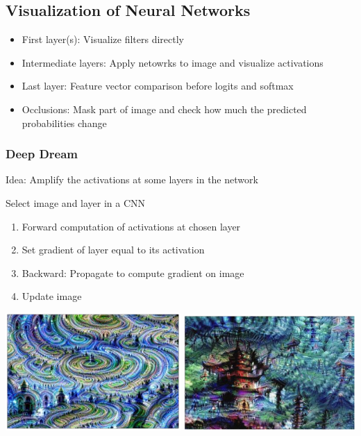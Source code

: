 \subsection{Visualization of Neural Networks}
\begin{itemize}
    \item First layer(s): Visualize filters directly
    \item Intermediate layers: Apply netowrks to image and visualize activations
    \item Last layer: Feature vector comparison before logits and softmax
    \item Occlusions: Mask part of image and check how much the predicted probabilities change
\end{itemize}

\subsubsection{Deep Dream}
\begin{minipage}{0.5\textwidth}
    Idea: Amplify the activations at some layers in the network

    Select image and layer in a CNN
    \begin{enumerate}
        \item Forward computation of activations at chosen layer
        \item Set gradient of layer equal to its activation
        \item Backward: Propagate to compute gradient on image
        \item Update image
    \end{enumerate}
\end{minipage}
\begin{minipage}{0.5\textwidth}
    \includegraphics[width=0.5\textwidth]{sections/GeneratingImages/img/deepdream1.png}
    \includegraphics[width=0.49\textwidth]{sections/GeneratingImages/img/deepdream2.png}
\end{minipage}

